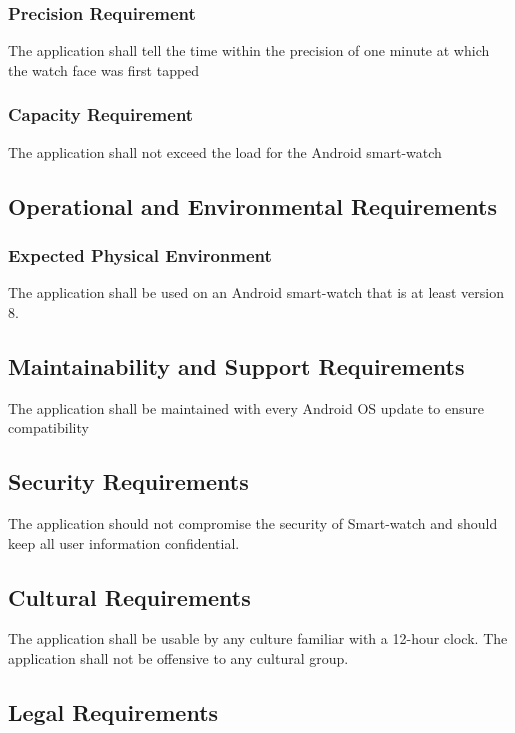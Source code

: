 \documentclass[12pt, titlepage]{article}
\begin{document}
\subsubsection{Precision Requirement}

The application shall tell the time within the precision of one minute at which the watch face was first tapped

\subsubsection{Capacity Requirement}

The application shall not exceed the load for the Android smart-watch

\subsection{Operational and Environmental Requirements}

\subsubsection{Expected Physical Environment}

The application shall be used on an Android smart-watch that is at least version 8.

\subsection{Maintainability and Support Requirements}

The application shall be maintained with every Android OS update to ensure compatibility

\subsection{Security Requirements}

The application should not compromise the security of Smart-watch and should keep all user information confidential.

\subsection{Cultural Requirements}

The application shall be usable by any culture familiar with a 12-hour clock. The application shall not be offensive to any cultural group.

\subsection{Legal Requirements}
\end{document}
